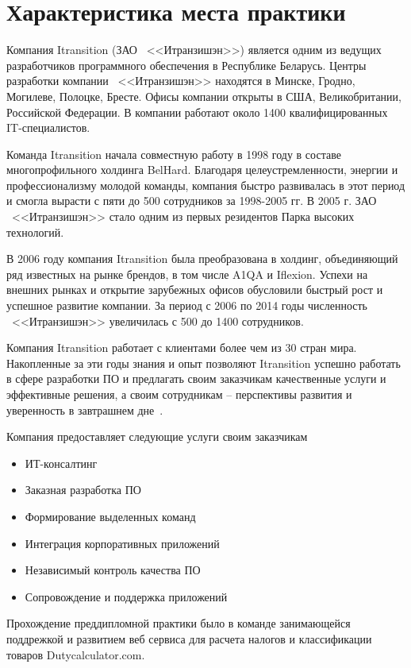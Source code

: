 \section{Характеристика места практики}
\label{sec:practice:itechart_characteristics}
\newcommand{\company}{\mbox{<<Итранзишэн>>}}

Компания Itransition (ЗАО ~\company{}) является одним из ведущих разработчиков программного обеспечения в Республике Беларусь. Центры разработки компании ~\company{} находятся в Минске, Гродно, Могилеве, Полоцке, Бресте. Офисы компании открыты в США, Великобритании, Российской Федерации. В компании работают около 1400 квалифицированных IT-специалистов.

Команда Itransition начала совместную работу в 1998 году в составе многопрофильного холдинга BelHard. Благодаря целеустремленности, энергии и профессионализму молодой команды, компания быстро развивалась в этот период и смогла вырасти с пяти до 500 сотрудников за 1998-2005 гг. В 2005 г. ЗАО ~\company{} стало одним из первых резидентов Парка высоких технологий.

В 2006 году компания Itransition была преобразована в холдинг, объединяющий ряд известных на рынке брендов, в том числе A1QA и Iflexion. Успехи на внешних рынках и открытие зарубежных офисов обусловили быстрый рост и успешное развитие компании. За период с 2006 по 2014 годы численность ~\company{} увеличилась с 500 до 1400 сотрудников.

Компания Itransition работает с клиентами более чем из 30 стран мира. Накопленные за эти годы знания и опыт позволяют Itransition успешно работать в сфере разработки ПО и предлагать своим заказчикам качественные услуги и эффективные решения, а своим сотрудникам – перспективы развития и уверенность в завтрашнем дне~\cite{itransition_2017}.

Компания предоставляет следующие услуги своим заказчикам~
\begin{itemize}
  \item ИТ-консалтинг
  \item Заказная разработка ПО
  \item Формирование выделенных команд
  \item Интеграция корпоративных приложений
  \item Независимый контроль качества ПО
  \item Сопровождение и поддержка приложений
\end{itemize}

Прохождение преддипломной практики было в команде занимающейся поддрежкой и развитием веб сервиса для расчета налогов и классификации товаров
Dutycalculator.com. 